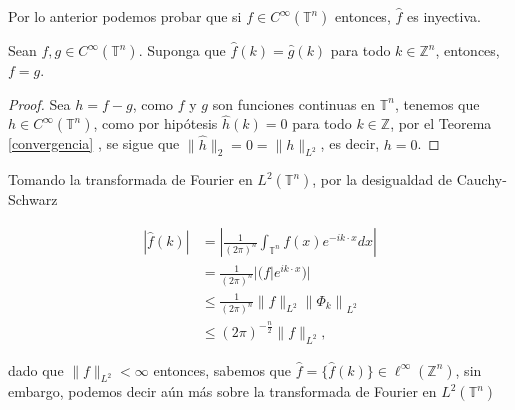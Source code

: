 \documentclass[12pt]{article}
\newcommand\Z{\ensuremath{\mathbb{Z}}}
\newcommand\T{\mathbb{T}}
\renewcommand{\hat}{\widehat}
\begin{document}
Por lo anterior podemos probar que si $f\in C^{\infty}(\T^{n})$ entonces, $\widehat{f}$ es inyectiva.
\begin{theorem}\label{inyectiva}
Sean $f, g \in C^{\infty}(\T^{n})$. Suponga que $\widehat{f}(k) = \widehat{g}(k)$ para todo $k \in \mathbb{Z}^{n}$, entonces, $f = g$.
\end{theorem}
\begin{proof}

 Sea $h = f - g$, como $f$ y $g$ son funciones continuas en $\T^{n}$, tenemos que $h \in C^{\infty}(\T^{n})$, como por hipótesis $\hat{h}(k) = 0$ para todo $k \in \mathbb{Z}$, por el Teorema \ref{convergencia}  , se sigue que $\|\hat{h}\|_2= 0=\|h\|_{L^2}$, es decir, $h = 0$.       
\end{proof}
        
\begin{note}
  Tomando la transformada de Fourier en $L^2(\T^n)$, por la desigualdad de Cauchy-Schwarz

$$
\begin{aligned}
|\hat{f}(k)| & =\left|\frac{1}{(2 \pi)^n} \int_{\T^n} f(x) e^{-i k \cdot x} d x\right| \\
& =\frac{1}{(2 \pi)^n} |(f|e^{i k \cdot x}) | \\
& \leq \frac{1}{(2 \pi)^n}\|f\|_{L^2}\left\|\Phi_k \right\|_{L^2} \\
& \leq(2 \pi)^{-\frac{n}{2}}\|f\|_{L^2},
\end{aligned}
$$

dado que $\|f\|_{L^2}<\infty$ entonces, sabemos que $\widehat{f}=\{\widehat{f}(k)\}\in \ell^{\infty}(\Z^n)$, sin embargo, podemos decir aún más sobre la transformada de Fourier en $L^2(\T^n)$  
\end{note}
\end{document}
